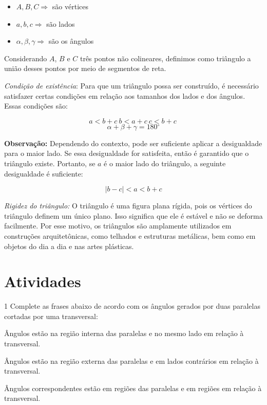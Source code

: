 {\begin{itemize}
\item $A, B, C \Rightarrow$ são vértices
\item $a, b, c \Rightarrow$ são lados
\item $\alpha, \beta, \gamma \Rightarrow$ são os ângulos
\end{itemize}

Considerando $A$, $B$ e $C$ três pontos não colineares, definimos como
triângulo a união desses pontos por meio de segmentos de reta.


\medskip \noindent \textit{Condição de existência}: Para que um triângulo possa ser construído, é necessário satisfazer certas
condições em relação aos tamanhos dos lados e dos ângulos. Essas condições
são:

$$ a < b + c\ b < a + c\ c < b + c\ $$
$$\alpha + \beta + \gamma = 180{^\circ}$$




\medskip \noindent \textbf{Observação:} Dependendo do contexto, pode ser
 suficiente aplicar a desigualdade para o maior lado. Se essa desigualdade
 for satisfeita, então é garantido que o triângulo existe. Portanto, se $a$ é o
 maior lado do triângulo, a seguinte desigualdade é suficiente:

$$\left| b - c \right| < a < b + c$$

\medskip \noindent \textit{Rigidez do triângulo:} O triângulo é uma figura plana rígida, pois os vértices do triângulo definem
um único plano. Isso significa que ele é estável e não se deforma facilmente.
Por esse motivo, os triângulos são amplamente utilizados em construções
arquitetônicas, como telhados e estruturas metálicas, bem como em objetos do
dia a dia e nas artes plásticas.}

\section*{Atividades}

\num{1} Complete as frases abaixo de acordo com os ângulos gerados por duas
paralelas cortadas por uma transversal:

\begin{escolha}[itemsep=0pt]
\item Ângulos  estão na região interna das paralelas e no mesmo lado
em relação à transversal.
\item Ângulos  estão na região externa das paralelas e em lados
contrários em relação à transversal.
\item Ângulos correspondentes estão em regiões  das paralelas e em
regiões  em relação à transversal.
\end{escolha}

